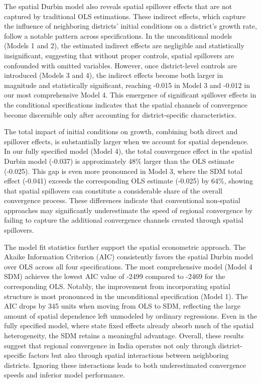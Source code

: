 \documentclass[
  a4paper, 
  twoside,
  review
]{article}
\begin{document}
The spatial Durbin model also reveals spatial spillover effects that are
not captured by traditional OLS estimations. These indirect effects,
which capture the influence of neighboring districts' initial conditions
on a district's growth rate, follow a notable pattern across
specifications. In the unconditional models (Models 1 and 2), the
estimated indirect effects are negligible and statistically
insignificant, suggesting that without proper controls, spatial
spillovers are confounded with omitted variables. However, once
district-level controls are introduced (Models 3 and 4), the indirect
effects become both larger in magnitude and statistically significant,
reaching -0.015 in Model 3 and -0.012 in our most comprehensive Model 4.
This emergence of significant spillover effects in the conditional
specifications indicates that the spatial channels of convergence become
discernible only after accounting for district-specific characteristics.

The total impact of initial conditions on growth, combining both direct
and spillover effects, is substantially larger when we account for
spatial dependence. In our fully specified model (Model 4), the total
convergence effect in the spatial Durbin model (-0.037) is approximately
48\% larger than the OLS estimate (-0.025). This gap is even more
pronounced in Model 3, where the SDM total effect (-0.041) exceeds the
corresponding OLS estimate (-0.025) by 64\%, showing that spatial
spillovers can constitute a considerable share of the overall
convergence process. These differences indicate that conventional
non-spatial approaches may significantly underestimate the speed of
regional convergence by failing to capture the additional convergence
channels created through spatial spillovers.

The model fit statistics further support the spatial econometric
approach. The Akaike Information Criterion (AIC) consistently favors the
spatial Durbin model over OLS across all four specifications. The most
comprehensive model (Model 4 SDM) achieves the lowest AIC value of -2499
compared to -2469 for the corresponding OLS. Notably, the improvement
from incorporating spatial structure is most pronounced in the
unconditional specification (Model 1). The AIC drops by 345 units when
moving from OLS to SDM, reflecting the large amount of spatial
dependence left unmodeled by ordinary regressions. Even in the fully
specified model, where state fixed effects already absorb much of the
spatial heterogeneity, the SDM retains a meaningful advantage. Overall,
these results suggest that regional convergence in India operates not
only through district-specific factors but also through spatial
interactions between neighboring districts. Ignoring these interactions
leads to both underestimated convergence speeds and inferior model
performance.
\end{document}
